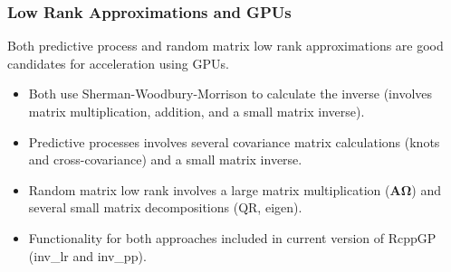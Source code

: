 \documentclass[t]{beamer}\usepackage[]{graphicx}\usepackage[]{color}
\begin{document}
\begin{frame}[fragile]
\frametitle{Low Rank Approximations and GPUs}

Both predictive process and random matrix low rank approximations are good candidates for acceleration using GPUs.

\vspace{3mm}

\begin{itemize}
\item Both use Sherman-Woodbury-Morrison to calculate the inverse (involves matrix multiplication, addition, and a small matrix inverse).

\vspace{3mm}

\item Predictive processes involves several covariance matrix calculations (knots and cross-covariance) and a small matrix inverse.

\vspace{3mm}

\item Random matrix low rank involves a large matrix multiplication ($\bm{A}\bm{\Omega}$) and several small matrix decompositions (QR, eigen).

\vspace{3mm}

\item Functionality for both approaches included in current version of RcppGP (inv\_lr and
inv\_pp).

\end{itemize}

\end{frame}

\end{document}
